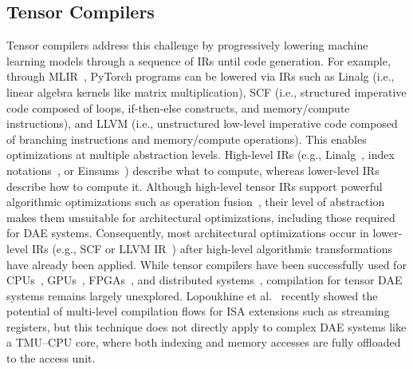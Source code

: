 \subsection{Tensor Compilers} \label{sec:related-work-tensor-compilers}
Tensor compilers address this challenge by progressively lowering machine learning models through a sequence of IRs until code generation. For example, through MLIR~\cite{lattner2021cgo}, PyTorch programs can be lowered via IRs such as Linalg (i.e., linear algebra kernels like matrix multiplication), SCF (i.e., structured imperative code composed of loops, if-then-else constructs, and memory/compute instructions), and LLVM (i.e., unstructured low-level imperative code composed of branching instructions and memory/compute operations). This enables optimizations at multiple abstraction levels. High-level IRs (e.g., Linalg~\cite{lattner2021cgo}, index notations~\cite{kjolstad2017oopsla,bik2022taco}, or Einsums~\cite{abadi2015tensorflow}) describe what to compute, whereas lower-level IRs describe how to compute it. Although high-level tensor IRs support powerful algorithmic optimizations such as operation fusion~\cite{abadi2015tensorflow,paszke2019neurips,wang2019arxiv,bradbury2018jax,fey2019iclrworkshop,smelyanskiy2018arxiv}, their level of abstraction makes them unsuitable for architectural optimizations, including those required for DAE systems. Consequently, most architectural optimizations occur in lower-level IRs (e.g., SCF or LLVM IR~\cite{lattner2004cgo}) after high-level algorithmic transformations have already been applied. While tensor compilers have been successfully used for CPUs~\cite{kjolstad2017oopsla,bik2022taco,ahrens2023cgo,bansal2023pldi,kovach2023pldi}, GPUs~\cite{senanayake2020oopsla,ye2023asplos,liu2024unisparse}, FPGAs~\cite{liu2024unisparse}, and distributed systems~\cite{yadav2022sc}, compilation for tensor DAE systems remains largely unexplored. Lopoukhine et al.~\cite{lopoukhine2025cgo} recently showed the potential of multi-level compilation flows for ISA extensions such as streaming registers, but this technique does not directly apply to complex DAE systems like a TMU--CPU core, where both indexing and memory accesses are fully offloaded to the access unit.

